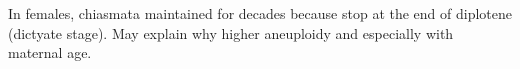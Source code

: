 In females, chiasmata maintained for decades because stop at the end of diplotene (dictyate stage). May explain why higher aneuploidy and especially with maternal age.









%


%


